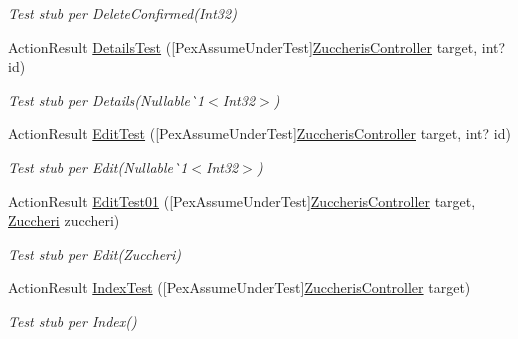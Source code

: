 \begin{DoxyCompactItemize}
\begin{DoxyCompactList}\small\item\em Test stub per Delete\+Confirmed(\+Int32)\end{DoxyCompactList}\item 
Action\+Result \mbox{\hyperlink{class_brew_day2_1_1_controllers_1_1_tests_1_1_zuccheris_controller_test_af96de6a10f462777aa3791e5268b2084}{Details\+Test}} (\mbox{[}Pex\+Assume\+Under\+Test\mbox{]}\mbox{\hyperlink{class_brew_day2_1_1_controllers_1_1_zuccheris_controller}{Zuccheris\+Controller}} target, int? id)
\begin{DoxyCompactList}\small\item\em Test stub per Details(Nullable\`{}1$<$Int32$>$)\end{DoxyCompactList}\item 
Action\+Result \mbox{\hyperlink{class_brew_day2_1_1_controllers_1_1_tests_1_1_zuccheris_controller_test_a06808d5f0730d8f1336650afd6627f08}{Edit\+Test}} (\mbox{[}Pex\+Assume\+Under\+Test\mbox{]}\mbox{\hyperlink{class_brew_day2_1_1_controllers_1_1_zuccheris_controller}{Zuccheris\+Controller}} target, int? id)
\begin{DoxyCompactList}\small\item\em Test stub per Edit(Nullable\`{}1$<$Int32$>$)\end{DoxyCompactList}\item 
Action\+Result \mbox{\hyperlink{class_brew_day2_1_1_controllers_1_1_tests_1_1_zuccheris_controller_test_a71260f0c81d9ee6b913fd5b2d732a03e}{Edit\+Test01}} (\mbox{[}Pex\+Assume\+Under\+Test\mbox{]}\mbox{\hyperlink{class_brew_day2_1_1_controllers_1_1_zuccheris_controller}{Zuccheris\+Controller}} target, \mbox{\hyperlink{class_brew_day2_1_1_models_1_1_zuccheri}{Zuccheri}} zuccheri)
\begin{DoxyCompactList}\small\item\em Test stub per Edit(\+Zuccheri)\end{DoxyCompactList}\item 
Action\+Result \mbox{\hyperlink{class_brew_day2_1_1_controllers_1_1_tests_1_1_zuccheris_controller_test_af73879bca38b063e16c86425c89fecd6}{Index\+Test}} (\mbox{[}Pex\+Assume\+Under\+Test\mbox{]}\mbox{\hyperlink{class_brew_day2_1_1_controllers_1_1_zuccheris_controller}{Zuccheris\+Controller}} target)
\begin{DoxyCompactList}\small\item\em Test stub per Index()\end{DoxyCompactList}\end{DoxyCompactItemize}


